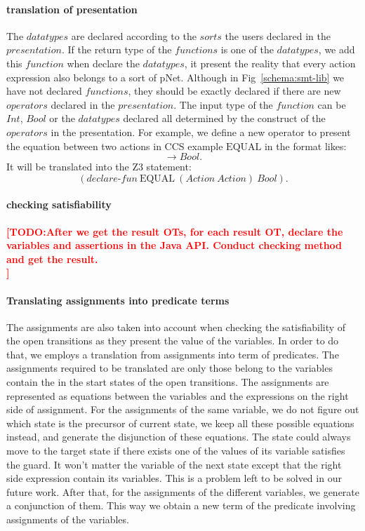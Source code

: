 \documentclass{lncs/llncs}
\newcommand{\TODO}[1]{\textcolor{red}{\textbf{[TODO:#1]}}}
\newcommand{\QIN}[1]{\textcolor{airforceblue}{#1}}
\begin{document}
\paragraph{translation of presentation}
\QIN{
The $datatypes$ are declared according to the $sorts$ the users declared in the $presentation$. If the return type of the $functions$ is one of the $datatypes$, we add this $function$ when declare the $datatypes$, it present the reality that every action expression also belongs to a sort of pNet. Although in Fig~\ref{schema:smt-lib} we have not declared $functions$, they should be exactly declared if there are new $operators$ declared in the $presentation$. The input type of the $function$ can be $Int$, $Bool$ or the $datatypes$ declared all determined by the construct of the  $operators$ in the presentation. For example, we define a new operator to present the equation between two actions in CCS example $\text{EQUAL}$ in the format likes:
}
\[< Action , Action > \rightarrow Bool .\]
\QIN{
It will be translated into the Z3 statement: 
}
\[(declare\text{-}fun\ \text{EQUAL}\ (Action\ Action)\ Bool) .\]

\paragraph{checking satisfiability}
\TODO{After we get the result OTs, for each result OT, declare the variables and assertions in the Java API. Conduct checking method and get the result.\\}

\paragraph{Translating assignments into predicate terms}
\QIN{
The assignments are also taken into account when checking the satisfiability of the open transitions as they present the value of the variables. In order to do that, we employs a translation from assignments into term of predicates. The assignments required to be translated are only those belong to the variables contain the in the start states of the open transitions. The assignments are represented as equations between the variables and the expressions on the right side of assignment. For the assignments of the same variable, we do not figure out which state is the precursor of current state, we keep all these possible equations instead, and generate the disjunction of these equations. The state could always move to the target state if there exists one of the values of its variable satisfies the guard. It won't matter the variable of the next state except that the right side expression contain its variables. This is a problem left to be solved in our future work. After that, for the assignments of the different variables, we generate a conjunction of them. This way we obtain a new term of the predicate involving assignments of the variables.
}
\end{document}
